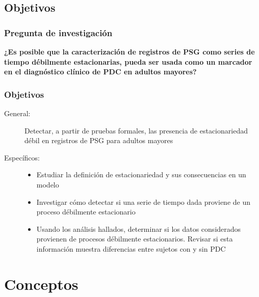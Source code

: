 \documentclass{beamer}
\begin{document}
\subsection{Objetivos}

\begin{frame}\frametitle{Pregunta de investigaci\'on}
\textbf{
¿Es posible que la caracterizaci\'on de registros de PSG como series de tiempo d\'ebilmente 
estacionarias, pueda ser usada como un marcador en el diagn\'ostico cl\'inico de PDC en adultos 
mayores?
}

\end{frame}


\begin{frame}\frametitle{Objetivos}
{\small
\begin{description}
\item[General:]
Detectar, a partir de pruebas formales, las presencia de estacionariedad d\'ebil 
en registros de PSG para adultos mayores%

\item[Espec\'ificos:]
\begin{itemize}
\item Estudiar la definici\'on de estacionariedad y sus consecuencias en un modelo

\item Investigar c\'omo detectar si una serie de tiempo dada proviene de un proceso
d\'ebilmente estacionario

\item Usando los an\'alisis hallados, determinar si los datos considerados provienen de 
procesos débilmente estacionarios.
Revisar si esta informaci\'on muestra diferencias entre sujetos con y sin PDC
\end{itemize}
\end{description}
}
\end{frame}


\section{Conceptos}
\end{document}
